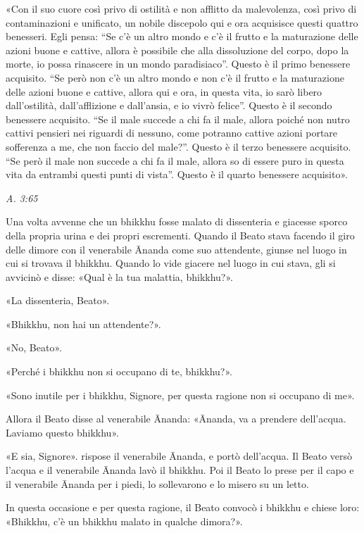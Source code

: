 «Con il suo cuore così privo di ostilità e non afflitto da malevolenza,
così privo di contaminazioni e unificato, un nobile discepolo qui e ora
acquisisce questi quattro benesseri. Egli pensa: “Se c’è un altro mondo
e c’è il frutto e la maturazione delle azioni buone e cattive, allora è
possibile che alla dissoluzione del corpo, dopo la morte, io possa
rinascere in un mondo paradisiaco”. Questo è il primo benessere
acquisito. “Se però non c’è un altro mondo e non c’è il frutto e la
maturazione delle azioni buone e cattive, allora qui e ora, in questa
vita, io sarò libero dall’ostilità, dall’afflizione e dall’ansia, e io
vivrò felice”. Questo è il secondo benessere acquisito. “Se il male
succede a chi fa il male, allora poiché non nutro cattivi pensieri nei
riguardi di nessuno, come potranno cattive azioni portare sofferenza a
me, che non faccio del male?”. Questo è il terzo benessere acquisito.
“Se però il male non succede a chi fa il male, allora so di essere puro
in questa vita da entrambi questi punti di vista”. Questo è il quarto
benessere acquisito».


\emph{A. 3:65}


Una volta avvenne che un bhikkhu fosse malato di dissenteria e giacesse
sporco della propria urina e dei propri escrementi. Quando il Beato
stava facendo il giro delle dimore con il venerabile Ānanda come suo
attendente, giunse nel luogo in cui si trovava il bhikkhu. Quando lo
vide giacere nel luogo in cui stava, gli si avvicinò e disse: «Qual è la
tua malattia, bhikkhu?».


«La dissenteria, Beato».


«Bhikkhu, non hai un attendente?».


«No, Beato».


«Perché i bhikkhu non si occupano di te, bhikkhu?».


«Sono inutile per i bhikkhu, Signore, per questa ragione non si occupano
di me».


Allora il Beato disse al venerabile Ānanda: «Ānanda, va a prendere
dell’acqua. Laviamo questo bhikkhu».


«E sia, Signore». rispose il venerabile Ānanda, e portò dell’acqua. Il
Beato versò l’acqua e il venerabile Ānanda lavò il bhikkhu. Poi il Beato
lo prese per il capo e il venerabile Ānanda per i piedi, lo sollevarono
e lo misero su un letto.


In questa occasione e per questa ragione, il Beato convocò i bhikkhu e
chiese loro: «Bhikkhu, c’è un bhikkhu malato in qualche dimora?».


